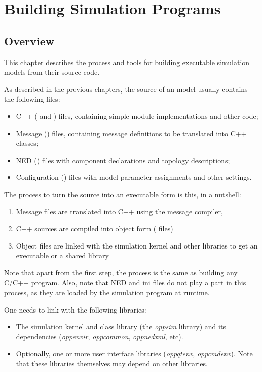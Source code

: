 \chapter{Building Simulation Programs}
\label{cha:build-sim-progs}

\section{Overview}
\label{sec:build-sim-progs:overview}

This chapter describes the process and tools for building executable simulation
models from their source code.

As described in the previous chapters, the source of an {\opp} model usually
contains the following files:

\begin{itemize}
  \item C++ ( and ) files, containing simple module
        implementations and other code;
  \item Message () files, containing message definitions to be
        translated into C++ classes;
  \item NED () files with component declarations and topology
        descriptions;
  \item Configuration () files with model parameter assignments and 
        other settings.
\end{itemize}

The process to turn the source into an executable form is this, in a nutshell:

\begin{enumerate}
  \item Message files are translated into C++ using the message compiler,
  \item C++ sources are compiled into object form ( files)
  \item Object files are linked with the simulation kernel and other 
        libraries to get an executable or a shared library
\end{enumerate}

Note that apart from the first step, the process is the same as building any 
C/C++ program. Also, note that NED and ini files do not play a part in this
process, as they are loaded by the simulation program at runtime.

One needs to link with the following libraries:

\begin{itemize}
  \item The simulation kernel and class library (the
        \textit{oppsim} library) and its dependencies (\textit{oppenvir},
        \textit{oppcommon}, \textit{oppnedxml}, etc).
  \item Optionally, one or more user interface libraries
        (\textit{oppqtenv}, \textit{oppcmdenv}). Note that these libraries
        themselves may depend on other libraries.
\end{itemize}

